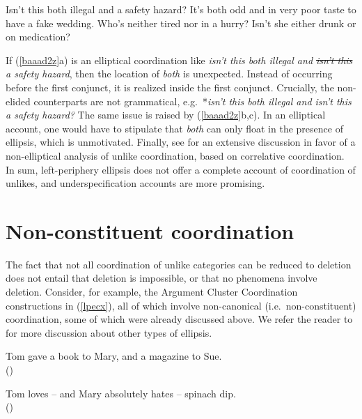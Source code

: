 {\begin{exe}
\ex
\begin{xlista}
\ex Isn't this both illegal and a safety hazard?
\ex It's both odd and in very poor taste to have a fake wedding.
\ex Who's neither tired nor in a hurry?
\ex Isn't she either drunk or on medication?
\end{xlista}\label{baaad2z}
\end{exe}



\noindent
 If (\ref{baaad2z}a) is an elliptical coordination
like \emph{isn't this both illegal and \sout{isn't this} a safety
hazard}, then the location of \emph{both} is unexpected. Instead of
occurring before the first conjunct, it is realized inside the first
conjunct. Crucially, the non-elided counterparts are not
grammatical, e.g.\ *\emph{isn't this both illegal and isn't this a
safety hazard?} The same issue is raised by (\ref{baaad2z}b,c). In
an elliptical account, one would have to stipulate
that \emph{both} can only float in the presence of ellipsis, which
is unmotivated.
Finally, see \citet{Mouret:07} for  an extensive discussion in favor of a non-elliptical analysis of unlike coordination, based on correlative coordination.
In sum, left-periphery ellipsis does not 
offer a complete account of coordination of unlikes, and underspecification
accounts are more promising.




\section{Non-constituent coordination}

The fact that not all coordination of unlike categories can be reduced to deletion  does not entail that
deletion is impossible, or that no phenomena involve deletion.
Consider, for example, the Argument Cluster Coordination constructions in (\ref{lpecx}), all of which 
involve non-canonical (i.e.\ non-constituent) coordination, 
some of which were already discussed above. We refer the reader to  for more discussion about other types of ellipsis.

\begin{exe}
\ex
\begin{xlista}
\ex 
\label{ex-tom-gave-a-book-to-mary-and-a-magazine-to-sue}
Tom gave a book to Mary, and a magazine to Sue.\\
()


\item Tom loves -- and Mary absolutely hates -- spinach dip.\\
()


\end{xlista}
\end{exe}}
